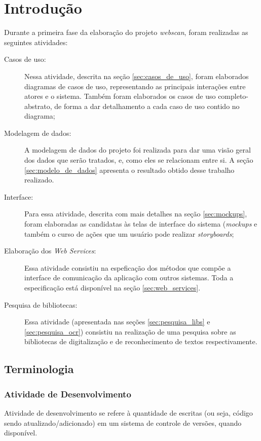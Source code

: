 \section{Introdução}
\label{sec:intro}

Durante a primeira fase da elaboração do projeto {\it webscan}, foram realizadas as seguintes atividades:

\begin{description}
    \item[Casos de uso: ] Nessa atividade, descrita na seção \ref{sec:casos_de_uso}, foram elaborados diagramas de casos de uso, representando as principais interações entre atores e o sistema. Também foram elaborados os casos de uso completo-abstrato, de forma a dar detalhamento a cada caso de uso contido no diagrama;
    \item[Modelagem de dados: ] A modelagem de dados do projeto foi realizada para dar uma visão geral dos dados que serão tratados, e, como eles se relacionam entre si. A seção \ref{sec:modelo_de_dados} apresenta o resultado obtido desse trabalho realizado. 
    \item[Interface: ] Para essa atividade, descrita com mais detalhes na seção \ref{sec:mockups}, foram elaboradas as candidatas às telas de interface do sistema ({\it mockups} e também o curso de ações que um usuário pode realizar {\it storyboards};
    \item[Elaboração dos {\it Web Services}: ] Essa atividade consistiu na
        espeficação dos métodos que compõe a interface de comunicação da
        aplicação com outros sistemas. Toda a especificação está disponível
        na seção \ref{sec:web_services}. 
    \item[Pesquisa de bibliotecas: ] Essa atividade (apresentada nas seções \ref{sec:pesquisa_libs} e \ref{sec:pesquisa_ocr}) consistiu na realização de uma pesquisa sobre as bibliotecas de digitalização e de reconhecimento de textos respectivamente.

\end{description}

\subsection{Terminologia}

\subsubsection{Atividade de Desenvolvimento}
Atividade de desenvolvimento se refere à quantidade de escritas (ou seja, código sendo atualizado/adicionado) em um sistema de controle de versões, quando disponível.

